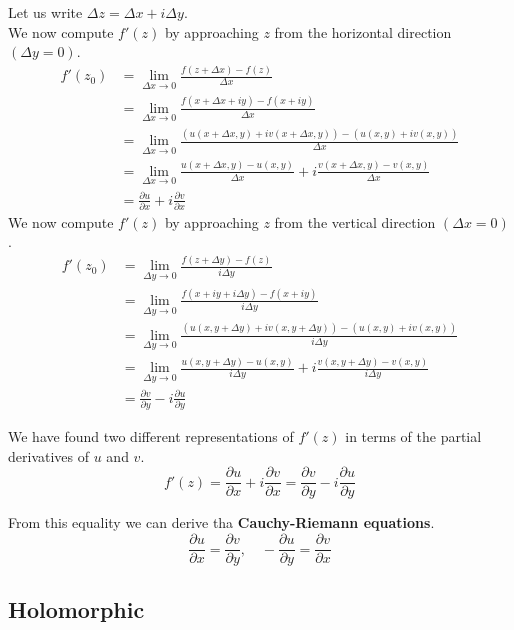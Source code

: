 \documentclass[a4paper]{article}
\begin{document}
Let us write \(\Delta z = \Delta x + i\Delta y\). \\
We now compute \(f'(z)\) by approaching \(z\) from the
horizontal direction \((\Delta y=0)\).
\begin{align*}
    f'(z_0) &= \lim_{\Delta x \to 0} \frac{f(z + \Delta x) - f(z)}{\Delta x} \\
    &= \lim_{\Delta x \to 0}
        \frac{f(x + \Delta x + iy) - f(x + iy)}{\Delta x} \\
    &= \lim_{\Delta x \to 0}
        \frac{(u(x + \Delta x, y) + iv(x + \Delta x, y)) - (u(x,y)+iv(x,y))}{\Delta x} \\
    &= \lim_{\Delta x \to 0}
        \frac{u(x + \Delta x, y) - u(x,y)}{\Delta x} + i\frac{v(x + \Delta x, y) - v(x,y)}{\Delta x} \\
    &= \frac{\partial u}{\partial x} + i \frac{\partial v}{\partial x}
\end{align*}
We now compute \(f'(z)\) by approaching \(z\) from the
vertical direction \((\Delta x=0)\).
\begin{align*}
    f'(z_0) &= \lim_{\Delta y \to 0} \frac{f(z + \Delta y) - f(z)}{i\Delta y} \\
    &= \lim_{\Delta y \to 0}
        \frac{f(x + iy + i\Delta y) - f(x + iy)}{i\Delta y} \\
    &= \lim_{\Delta y \to 0}
        \frac{(u(x, y + \Delta y) + iv(x, y + \Delta y)) - (u(x,y)+iv(x,y))}{i\Delta y} \\
    &= \lim_{\Delta y \to 0}
        \frac{u(x, y + \Delta y) - u(x,y)}{i\Delta y} + i\frac{v(x, y + \Delta y) - v(x,y)}{i\Delta y} \\
    &= \frac{\partial v}{\partial y} -i\frac{\partial u}{\partial y}
\end{align*}

We have found two different representations of \(f'(z)\) in terms
of the partial derivatives of \(u\) and \(v\).
\[
    f'(z)=\frac{\partial u}{\partial x} +i\frac{\partial v}{\partial x}
    = \frac{\partial v}{\partial y} -i \frac{\partial u}{\partial y}
\]

From this equality we can derive tha \textbf{Cauchy-Riemann equations}.
\[
    \frac{\partial u}{\partial x}=\frac{\partial v}{\partial y},
    \quad
    -\frac{\partial u}{\partial y}=\frac{\partial v}{\partial x}
\]

\pagebreak

\subsection{Holomorphic}
\end{document}
